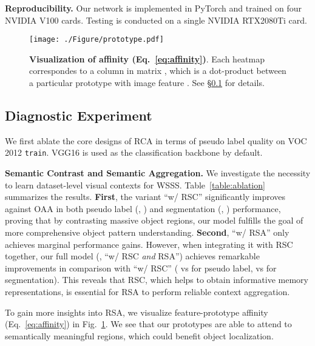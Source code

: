 \documentclass[10pt,twocolumn,letterpaper]{article}
\begin{document}
\noindent\textbf{Reproducibility.} Our network is implemented in PyTorch and trained on four \mbox{NVIDIA} V100 cards. Testing is conducted on a single \mbox{NVIDIA} \mbox{RTX2080Ti} card. 




\begin{figure}[t]
	\centering
	\texttt{[image: ./Figure/prototype.pdf]}
	\vspace{-18pt}
	\captionsetup{font=small}
	\caption{\small \textbf{Visualization of affinity  (Eq.~\ref{eq:affinity})}. Each heatmap correspondes to a column in matrix , which is a dot-product between  a particular prototype with image feature . See \S\ref{sec:ablation} for details.}
	\label{fig:affinity}
	\vspace{-5pt}
\end{figure}

\subsection{Diagnostic Experiment}\label{sec:ablation}

We first ablate the core designs of RCA in terms of pseudo label quality on  {VOC} 2012 \texttt{train}. \mbox{VGG16} is used as the classification backbone by default.

\noindent\textbf{Semantic Contrast and Semantic Aggregation.} We  investigate the necessity to learn dataset-level visual contexts for WSSS. Table~\ref{table:ablation} summarizes the results. \textbf{First}, the variant ``{w/} RSC'' significantly improves against OAA in both pseudo label (\ie, ) and segmentation (\ie, ) performance, proving that by contrasting massive object regions, our model fulfills the goal of  more comprehensive object pattern understanding. \textbf{Second}, ``{w/} RSA'' only achieves marginal  performance gains. However, when integrating it with RSC together, our full model (\ie, ``{w/} RSC \textit{and} RSA'') achieves remarkable improvements in comparison with ``{w/} RSC'' ( vs  for pseudo label,  vs  for segmentation). This reveals that RSC, which helps to obtain informative memory representations, is essential for RSA to perform  reliable context aggregation.

To gain more insights into RSA, we visualize feature-prototype affinity  (Eq.~\ref{eq:affinity}) in Fig.~\ref{fig:affinity}. We see that our prototypes are able to attend to semantically meaningful regions, which could benefit object localization.
\end{document}
